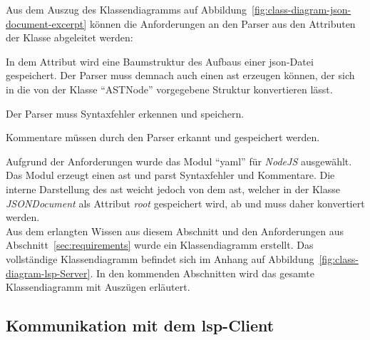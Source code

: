 Aus dem Auszug des Klassendiagramms auf Abbildung~\ref{fig:class-diagram-json-document-excerpt} können die Anforderungen an
den Parser aus den Attributen der Klasse abgeleitet werden:
\begin{description}
      \setlength\itemsep{-0.5cm}
      \item[root]
            In dem Attribut wird eine Baumstruktur des Aufbaus einer \ac{json}-Datei gespeichert. Der Parser muss demnach auch einen \ac{ast} erzeugen können,
            der sich in die von der Klasse ``ASTNode'' vorgegebene Struktur konvertieren lässt.
      \item[syntaxErrors] Der Parser muss Syntaxfehler erkennen und speichern.
      \item[comments] Kommentare müssen durch den Parser erkannt und gespeichert werden.
\end{description}

Aufgrund der Anforderungen wurde das Modul ``yaml'' für \textit{NodeJS} ausgewählt. Das Modul erzeugt einen \ac{ast} und parst Syntaxfehler und Kommentare.
Die interne Darstellung des \ac{ast} weicht jedoch von dem \ac{ast}, welcher in der Klasse \textit{JSONDocument} als Attribut \textit{root}
gespeichert wird, ab und muss daher konvertiert werden.
\\
Aus dem erlangten Wissen aus diesem Abschnitt und den Anforderungen aus Abschnitt~\ref{sec:requirements} wurde ein Klassendiagramm erstellt.
Das vollständige Klassendiagramm befindet sich im Anhang auf Abbildung~\ref{fig:class-diagram-lsp-Server}.
In den kommenden Abschnitten wird das gesamte Klassendiagramm mit Auszügen erläutert.

\subsection{Kommunikation mit dem \acs{lsp}-Client}\label{sec:lsp-client-communication}

